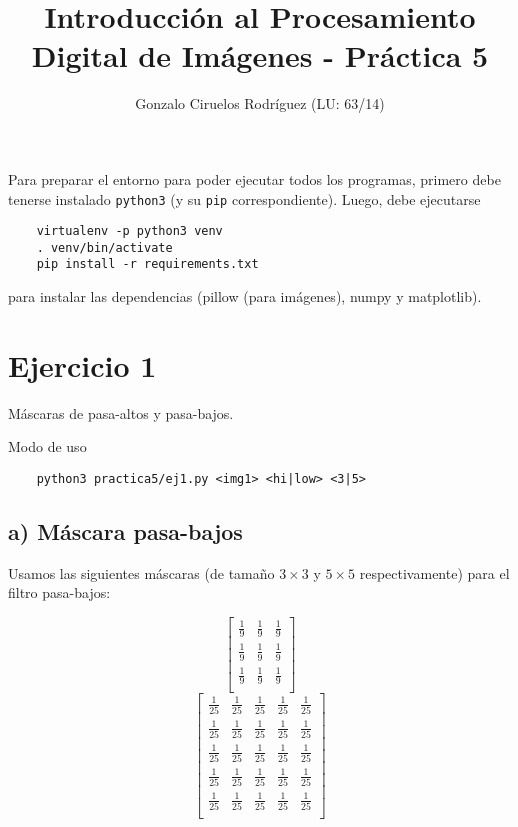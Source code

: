 \documentclass[11pt, spanish]{article}
\title{Introducción al Procesamiento Digital de Imágenes - Práctica 5}
\date{}
\author{Gonzalo Ciruelos Rodríguez (LU: 63/14)}
\begin{document}
\maketitle

Para preparar el entorno para poder ejecutar todos los programas,
primero debe tenerse instalado \texttt{python3} (y su \texttt{pip} correspondiente).
Luego, debe ejecutarse 
\begin{verbatim}
    virtualenv -p python3 venv 
    . venv/bin/activate
    pip install -r requirements.txt 
\end{verbatim}

\noindent para instalar las dependencias (pillow (para imágenes), numpy y matplotlib).



\section{Ejercicio 1}

Máscaras de pasa-altos y pasa-bajos.

Modo de uso
\begin{verbatim}
    python3 practica5/ej1.py <img1> <hi|low> <3|5>
\end{verbatim}

\subsection{a) Máscara pasa-bajos}

Usamos las siguientes máscaras (de tamaño $3 \times 3$ y $5 \times 5$ respectivamente) para el filtro pasa-bajos:

\[
\begin{bmatrix}
\frac{1}{9} & \frac{1}{9} & \frac{1}{9} \\
\frac{1}{9} & \frac{1}{9} & \frac{1}{9} \\
\frac{1}{9} & \frac{1}{9} & \frac{1}{9} \\
\end{bmatrix}
\]
\[
\begin{bmatrix}
\frac{1}{25} & \frac{1}{25} & \frac{1}{25} & \frac{1}{25} & \frac{1}{25} \\
\frac{1}{25} & \frac{1}{25} & \frac{1}{25} & \frac{1}{25} & \frac{1}{25} \\
\frac{1}{25} & \frac{1}{25} & \frac{1}{25} & \frac{1}{25} & \frac{1}{25} \\
\frac{1}{25} & \frac{1}{25} & \frac{1}{25} & \frac{1}{25} & \frac{1}{25} \\
\frac{1}{25} & \frac{1}{25} & \frac{1}{25} & \frac{1}{25} & \frac{1}{25} \\
\end{bmatrix}
\]
\end{document}
